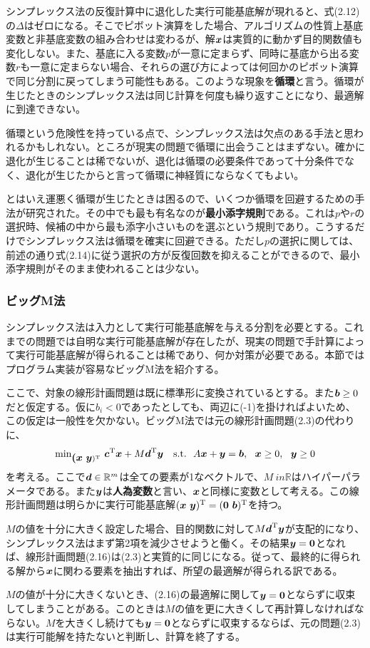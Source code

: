 \documentclass[dvipdfmx, 9pt, a4paper]{jsarticle}
\numberwithin{equation}{section}
\newcommand{\bm}[1]{{\mbox{\boldmath $#1$}}}
\begin{document}
シンプレックス法の反復計算中に退化した実行可能基底解が現れると、式(2.12)の$\Delta$はゼロになる。そこでピボット演算をした場合、アルゴリズムの性質上基底変数と非基底変数の組み合わせは変わるが、解$\bm x$は実質的に動かず目的関数値も変化しない。また、基底に入る変数$p$が一意に定まらず、同時に基底から出る変数$r$も一意に定まらない場合、それらの選び方によっては何回かのピボット演算で同じ分割に戻ってしまう可能性もある。このような現象を{\bf 循環}と言う。循環が生じたときのシンプレックス法は同じ計算を何度も繰り返すことになり、最適解に到達できない。\par
循環という危険性を持っている点で、シンプレックス法は欠点のある手法と思われるかもしれない。ところが現実の問題で循環に出会うことはまずない。確かに退化が生じることは稀でないが、退化は循環の必要条件であって十分条件でなく、退化が生じたからと言って循環に神経質にならなくてもよい。\par
とはいえ運悪く循環が生じたときは困るので、いくつか循環を回避するための手法が研究された。その中でも最も有名なのが{\bf 最小添字規則}である。これは$p$や$r$の選択時、候補の中から最も添字小さいものを選ぶという規則であり。こうするだけでシンプレックス法は循環を確実に回避できる。ただし$p$の選択に関しては、前述の通り式(2.14)に従う選択の方が反復回数を抑えることができるので、最小添字規則がそのまま使われることは少ない。

\subsubsection{ビッグM法}
シンプレックス法は入力として実行可能基底解を与える分割を必要とする。これまでの問題では自明な実行可能基底解が存在したが、現実の問題で手計算によって実行可能基底解が得られることは稀であり、何か対策が必要である。本節ではプログラム実装が容易なビッグM法を紹介する。\par
ここで、対象の線形計画問題は既に標準形に変換されているとする。また$\bm b \geq 0$だと仮定する。仮に$b_i < 0$であったとしても、両辺に(-1)を掛ければよいため、この仮定は一般性を欠かない。ビッグM法では元の線形計画問題(2.3)の代わりに、
\begin{equation}
{\rm min}_{\bm (\bm x~\bm y)^{\rm T}}~\bm c^{\rm T}\bm x+M\bm d^{\rm T}\bm y~~~
{\rm s.t.}~~A\bm x+\bm y=\bm b,~~\bm x \geq 0,~~\bm y \geq 0
\end{equation}
を考える。ここで$\bm d \in \mathbb{R}^m$は全ての要素が1なベクトルで、$M\ in \mathbb{R}$はハイパーパラメータである。また$\bm y$は{\bf 人為変数}と言い、$\bm x$と同様に変数として考える。この線形計画問題は明らかに実行可能基底解$(\bm x~\bm y)^{\rm T}=(\bm 0~\bm b)^{\rm T}$を持つ。\par
$M$の値を十分に大きく設定した場合、目的関数に対して$M\bm d^{\rm T}\bm y$が支配的になり、シンプレックス法はまず第2項を減少させようと働く。その結果$\bm y=\bm 0$となれば、線形計画問題(2.16)は(2.3)と実質的に同じになる。従って、最終的に得られる解から$\bm x$に関わる要素を抽出すれば、所望の最適解が得られる訳である。\par
$M$の値が十分に大きくないとき、(2.16)の最適解に関して$\bm y=\bm 0$とならずに収束してしまうことがある。このときは$M$の値を更に大きくして再計算しなければならない。$M$を大きくし続けても$\bm y=\bm 0$とならずに収束するならば、元の問題(2.3)は実行可能解を持たないと判断し、計算を終了する。
\end{document}
